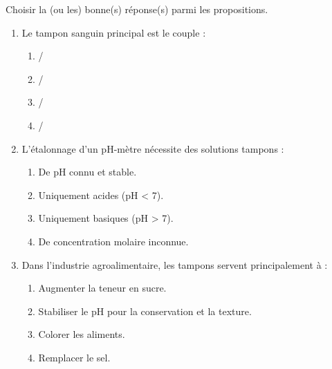 \documentclass[11pt]{article}
\begin{document}
\begin{exercice}
Choisir la (ou les) bonne(s) réponse(s) parmi les propositions.
\begin{enumerate}
    \item Le tampon sanguin principal est le couple :
    \begin{enumerate}
        \item {}/
        \item {}/
        \item {}/
        \item {}/
    \end{enumerate}
    \item L'étalonnage d'un pH-mètre nécessite des solutions tampons :
    \begin{enumerate}
        \item De pH connu et stable.
        \item Uniquement acides (pH < 7).
        \item Uniquement basiques (pH > 7).
        \item De concentration molaire inconnue.
    \end{enumerate}
    \item Dans l'industrie agroalimentaire, les tampons servent principalement à :
    \begin{enumerate}
        \item Augmenter la teneur en sucre.
        \item Stabiliser le pH pour la conservation et la texture.
        \item Colorer les aliments.
        \item Remplacer le sel.
    \end{enumerate}
\end{enumerate}
\end{exercice}
\end{document}
